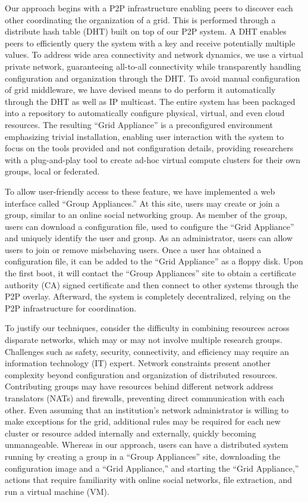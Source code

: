 \documentclass[conference]{IEEEtran}
\begin{document}
Our approach begins with a P2P infrastructure enabling peers to discover each
other coordinating the organization of a grid. This is performed through a
distribute hash table (DHT) built on top of our P2P system.  A DHT enables
peers to efficiently query the system with a key and receive potentially
multiple values.  To address wide area connectivity and network dynamics, we
use a virtual private network, guaranteeing all-to-all connectivity while
transparently handling configuration and organization through the DHT.  To
avoid manual configuration of grid middleware, we have devised means to do
perform it automatically through the DHT as well as IP multicast.  The entire
system has been packaged into a repository to automatically configure physical,
virtual, and even cloud resources.  The resulting ``Grid Appliance'' is a
preconfigured environment emphasizing trivial installation, enabling user
interaction with the system to focus on the tools provided and not
configuration details, providing researchers with a plug-and-play tool to
create ad-hoc virtual compute clusters for their own groups, local or
federated.  

To allow user-friendly access to these feature, we have implemented a web
interface called ``Group Appliances.''  At this site, users may create or join
a group, similar to an online social networking group.  As member of the group,
users can download a configuration file, used to configure the ``Grid
Appliance'' and uniquely identify the user and group.  As an administrator,
users can allow users to join or remove misbehaving users.  Once a user has
obtained a configuration file, it can be added to the ``Grid Appliance'' as a
floppy disk.  Upon the first boot, it will contact the ``Group Appliances''
site to obtain a certificate authority (CA) signed certificate and then connect
to other systems through the P2P overlay.  Afterward, the system is completely
decentralized, relying on the P2P infrastructure for coordination.

To justify our techniques, consider the difficulty in combining resources
across disparate networks, which may or may not involve multiple research
groups.  Challenges such as safety, security, connectivity, and efficiency may
require an information technology (IT) expert.  Network constraints present
another complexity beyond configuration and organization of distributed
resources.  Contributing groups may have resources behind different network
address translators (NATs) and firewalls, preventing direct communication with
each other.  Even assuming that an institution's network administrator is
willing to make exceptions for the grid, additional rules may be required for
each new cluster or resource added internally and externally, quickly becoming
unmanageable.  Whereas in our approach, users can have a distributed system
running by creating a group in a ``Group Appliances'' site, downloading the
configuration image and a ``Grid Appliance,'' and starting the ``Grid
Appliance,'' actions that require familiarity with online social networks, file
extraction, and run a virtual machine (VM).
\end{document}
